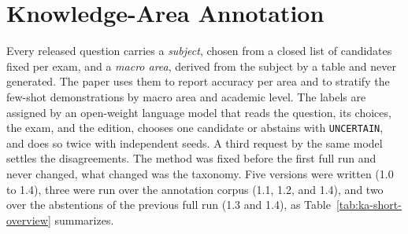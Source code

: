 %
%
\providecommand{\KnowledgeAreaFigDir}{ablations/knowledge_area/figures}

\section{Knowledge-Area Annotation}
\label{app:ka-short}

Every released question carries a \emph{subject}, chosen from a closed list of
candidates fixed per exam, and a \emph{macro area}, derived from the subject
by a table and never generated. The paper uses them to report accuracy per
area and to stratify the few-shot demonstrations by macro area and academic
level. The labels are assigned by an open-weight language model that reads
the question, its choices, the exam, and the edition, chooses one candidate or
abstains with \texttt{UNCERTAIN}, and does so twice with independent seeds. A
third request by the same model settles the disagreements. The method was
fixed before the first full run and never changed, what changed was the
taxonomy. Five versions were written (1.0 to 1.4), three were run over the
annotation corpus (1.1, 1.2, and 1.4), and two over the abstentions of the previous
full run (1.3 and 1.4), as Table~\ref{tab:ka-short-overview} summarizes.

